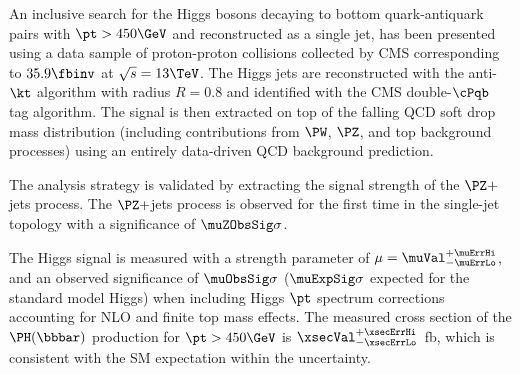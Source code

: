 An inclusive search for the Higgs bosons decaying to bottom quark-antiquark pairs with $\pt > 450\GeV$ and reconstructed as a single jet, has been presented using a data sample of proton-proton collisions collected by CMS corresponding to $35.9\fbinv$ at $\sqrt{s}=13\TeV$. 
The Higgs jets are reconstructed with the anti-$\kt$ algorithm with radius $R=0.8$ and identified with the CMS double-$\cPqb$ tag algorithm. The signal is then extracted on top of the falling QCD soft drop mass distribution (including contributions from $\PW$, $\PZ$, and top background processes) using an entirely data-driven QCD background prediction.

The analysis strategy is validated by extracting the signal strength of the $\PZ+$jets process. The $\PZ+$jets process is observed for the first time in the single-jet topology with a significance of $\muZObsSig\sigma$.

The Higgs signal is measured with a strength parameter of $\mu=\muVal_{-\muErrLo}^{+\muErrHi}$, and an observed significance of $\muObsSig\sigma$ ($\muExpSig\sigma$ expected for the standard model Higgs) when including Higgs $\pt$ spectrum corrections accounting for NLO and finite top mass effects. The measured cross section of the $\PH(\bbbar)$ production for $\pt>450\GeV$ is $\xsecVal_{-\xsecErrLo}^{+\xsecErrHi}$~fb, which is consistent with the SM expectation within the uncertainty.
